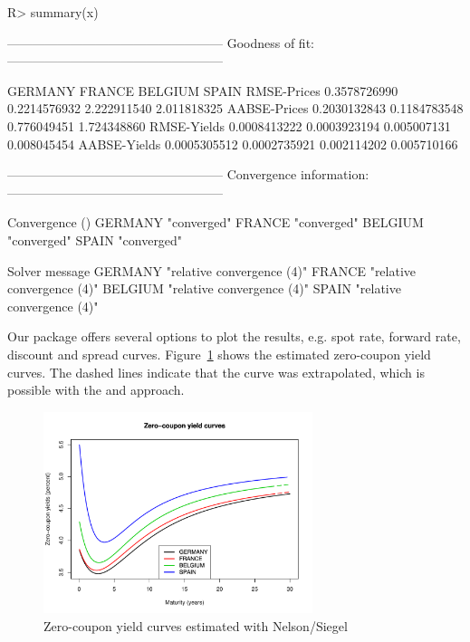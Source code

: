 \begin{Schunk}
\begin{Sinput}
R> summary(x)
\end{Sinput}
\begin{Soutput}
---------------------------------------------------
Goodness of fit:
---------------------------------------------------

                  GERMANY       FRANCE     BELGIUM       SPAIN
RMSE-Prices  0.3578726990 0.2214576932 2.222911540 2.011818325
AABSE-Prices 0.2030132843 0.1184783548 0.776049451 1.724348860
RMSE-Yields  0.0008413222 0.0003923194 0.005007131 0.008045454
AABSE-Yields 0.0005305512 0.0002735921 0.002114202 0.005710166


---------------------------------------------------
Convergence information:
---------------------------------------------------

        Convergence ()
GERMANY "converged"   
FRANCE  "converged"   
BELGIUM "converged"   
SPAIN   "converged"   

        Solver message            
GERMANY "relative convergence (4)"
FRANCE  "relative convergence (4)"
BELGIUM "relative convergence (4)"
SPAIN   "relative convergence (4)"
\end{Soutput}
\end{Schunk}



Our package offers several options to plot the results, e.g. spot rate, forward rate, discount and spread curves. Figure~\ref{fig:spotcurves} shows the estimated zero-coupon yield curves. The dashed lines indicate that the curve was extrapolated, which is possible with the \cite{Nelson1987} and \cite{Svensson1994} approach.

\begin{figure}[htb]
\centering
\includegraphics[width=0.7\textwidth]{fig_eurospotcurves}
\caption{Zero-coupon yield curves estimated with Nelson/Siegel}
\label{fig:spotcurves}
\end{figure}


